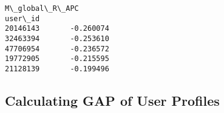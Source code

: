 \documentclass[11pt]{article}
\makeatletter
\newcommand{\boxspacing}{\kern\kvtcb@left@rule\kern\kvtcb@boxsep}
\newcommand{\prompt}[4]{
        {\ttfamily\llap{{\color{#2}[#3]:\hspace{3pt}#4}}\vspace{-\baselineskip}}
    }
\makeatother
\begin{document}
            \begin{tcolorbox}[breakable, size=fbox, boxrule=.5pt, pad at break*=1mm, opacityfill=0]
\prompt{Out}{outcolor}{11}{\boxspacing}
\begin{Verbatim}[commandchars=\\\{\}]
          M\_global\_R\_APC
user\_id
20146143       -0.260074
32463394       -0.253610
47706954       -0.236572
19772905       -0.215595
21128139       -0.199496
\end{Verbatim}
\end{tcolorbox}
        
    \hypertarget{calculating-gap-of-user-profiles}{%
\subsection{Calculating GAP of User
Profiles}\label{calculating-gap-of-user-profiles}}
\end{document}
